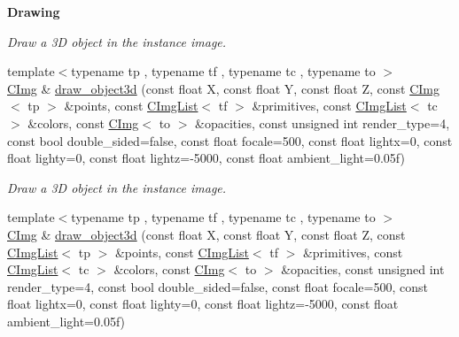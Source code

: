 \begin{Indent}{\bf Drawing}
\begin{DoxyCompactItemize}
\begin{DoxyCompactList}\small\item\em Draw a 3\-D object in the instance image. \end{DoxyCompactList}\item 
\hypertarget{structcimg__library_1_1_c_img_a91a604bb781434e241875e6e9ba0d2a7}{{\footnotesize template$<$typename tp , typename tf , typename tc , typename to $>$ }\\\hyperlink{structcimg__library_1_1_c_img}{C\-Img} \& \hyperlink{structcimg__library_1_1_c_img_a91a604bb781434e241875e6e9ba0d2a7}{draw\-\_\-object3d} (const float X, const float Y, const float Z, const \hyperlink{structcimg__library_1_1_c_img}{C\-Img}$<$ tp $>$ \&points, const \hyperlink{structcimg__library_1_1_c_img_list}{C\-Img\-List}$<$ tf $>$ \&primitives, const \hyperlink{structcimg__library_1_1_c_img_list}{C\-Img\-List}$<$ tc $>$ \&colors, const \hyperlink{structcimg__library_1_1_c_img}{C\-Img}$<$ to $>$ \&opacities, const unsigned int render\-\_\-type=4, const bool double\-\_\-sided=false, const float focale=500, const float lightx=0, const float lighty=0, const float lightz=-\/5000, const float ambient\-\_\-light=0.\-05f)}\label{structcimg__library_1_1_c_img_a91a604bb781434e241875e6e9ba0d2a7}

\begin{DoxyCompactList}\small\item\em Draw a 3\-D object in the instance image. \end{DoxyCompactList}\item 
\hypertarget{structcimg__library_1_1_c_img_a069041b36db48a75a5eeca855bbd19bd}{{\footnotesize template$<$typename tp , typename tf , typename tc , typename to $>$ }\\\hyperlink{structcimg__library_1_1_c_img}{C\-Img} \& \hyperlink{structcimg__library_1_1_c_img_a069041b36db48a75a5eeca855bbd19bd}{draw\-\_\-object3d} (const float X, const float Y, const float Z, const \hyperlink{structcimg__library_1_1_c_img_list}{C\-Img\-List}$<$ tp $>$ \&points, const \hyperlink{structcimg__library_1_1_c_img_list}{C\-Img\-List}$<$ tf $>$ \&primitives, const \hyperlink{structcimg__library_1_1_c_img_list}{C\-Img\-List}$<$ tc $>$ \&colors, const \hyperlink{structcimg__library_1_1_c_img}{C\-Img}$<$ to $>$ \&opacities, const unsigned int render\-\_\-type=4, const bool double\-\_\-sided=false, const float focale=500, const float lightx=0, const float lighty=0, const float lightz=-\/5000, const float ambient\-\_\-light=0.\-05f)}\label{structcimg__library_1_1_c_img_a069041b36db48a75a5eeca855bbd19bd}


\end{DoxyCompactItemize}
\end{Indent}
